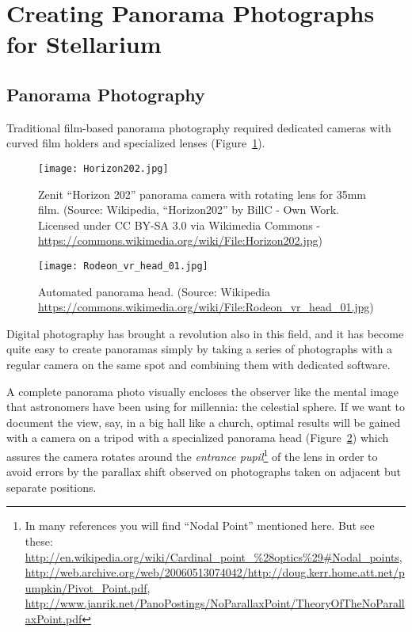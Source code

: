 \newpage

\section{Creating Panorama Photographs for Stellarium}
\label{sec:landscapes:PanoramaPhotography}

\subsection{Panorama Photography}
\label{sec:landscapes:PanoramaPhotography:Photography}

Traditional film-based panorama photography required dedicated cameras with curved
film holders and specialized lenses
(Figure~\ref{fig:landscapes:panoCam}).


\begin{figure}[tbp]
  \centering
 \texttt{[image: Horizon202.jpg]}
 \caption{Zenit ``Horizon 202'' panorama camera with rotating lens for
   35mm film. \footnotesize{(Source: Wikipedia, ``Horizon202'' by
     BillC - Own Work. Licensed under CC BY-SA 3.0 via Wikimedia Commons -
     \protect\url{https://commons.wikimedia.org/wiki/File:Horizon202.jpg})}}
  \label{fig:landscapes:panoCam}
\end{figure}



\begin{figure}[tbp]
  \centering
  \texttt{[image: Rodeon\_vr\_head\_01.jpg]}
  \caption{Automated panorama head. \footnotesize{(Source: Wikipedia \protect\url{https://commons.wikimedia.org/wiki/File:Rodeon_vr_head_01.jpg})}}
  \label{fig:landscapes:panoHead}
\end{figure}


Digital photography has brought a revolution also in this field, and it has
become quite easy to create panoramas simply by taking a series of
photographs with a regular camera on the same spot and combining them
with dedicated software.

A complete panorama photo visually encloses the observer like the
mental image that astronomers have been using for millennia: the
celestial sphere. If we want to document the view, say, in a big hall
like a church, optimal results will be gained with a camera on a
tripod with a specialized panorama head (Figure~\ref{fig:landscapes:panoHead}) which assures the camera
rotates around the \emph{entrance pupil}\footnote{In many references
  you will find ``Nodal Point'' mentioned here. But see these:
  \url{http://en.wikipedia.org/wiki/Cardinal_point_\%28optics\%29\#Nodal_points},
  \url{http://web.archive.org/web/20060513074042/http://doug.kerr.home.att.net/pumpkin/Pivot_Point.pdf},
  \url{http://www.janrik.net/PanoPostings/NoParallaxPoint/TheoryOfTheNoParallaxPoint.pdf}
} of the lens in order to avoid errors by the parallax shift observed
on photographs taken on adjacent but separate positions.


